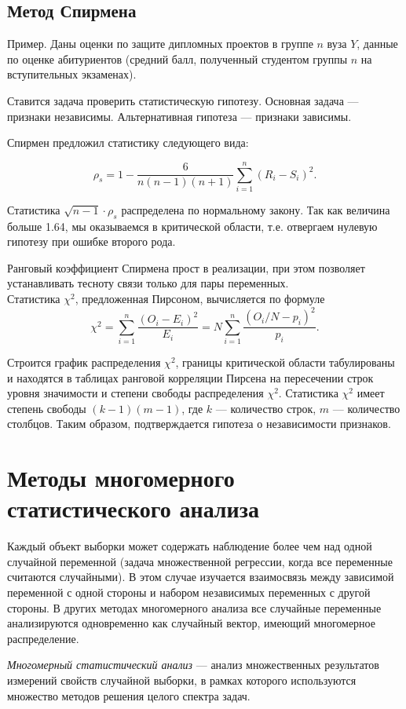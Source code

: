 \documentclass[12pt]{article}
\begin{document}
\subsection{Метод Спирмена}
Пример. Даны оценки по защите дипломных проектов в группе $n$ вуза $Y$, данные по оценке абитуриентов (средний балл, полученный студентом группы $n$ на вступительных экзаменах).

Ставится задача проверить статистическую гипотезу. Основная задача --- признаки независимы. Альтернативная гипотеза --- признаки зависимы.

Спирмен предложил статистику следующего вида:

\[ \rho_s = 1 - \frac{6}{n (n - 1) (n + 1)} \sum_{i=1}^n (R_i - S_i)^2.\]

Статистика $\sqrt{n-1} \cdot \rho_s$ распределена по нормальному закону. Так как величина больше 1.64, мы оказываемся в критической области, т.е. отвергаем нулевую гипотезу при ошибке второго рода.

Ранговый коэффициент Спирмена прост в реализации, при этом позволяет устанавливать тесноту связи только для пары переменных.\\

Статистика $\chi^2$, предложенная Пирсоном, вычисляется по формуле
\[ \chi^2 = \sum_{i=1}^n \frac{(O_i - E_i)^2}{E_i} = N \sum_{i=1}^n \frac{(O_i/N - p_i)^2}{p_i}.\]

Строится график распределения $\chi^2$, границы критической области табулированы и находятся в таблицах ранговой корреляции Пирсена на пересечении строк уровня значимости и степени свободы распределения $\chi^2$. Статистика $\chi^2$ имеет степень свободы $(k-1) (m-1)$, где $k$ --- количество строк, $m$ --- количество столбцов. Таким образом, подтверждается гипотеза о независимости признаков.


\newpage
\section{Методы многомерного статистического анализа}
Каждый объект выборки может содержать наблюдение более чем над одной случайной переменной (задача множественной регрессии, когда все переменные считаются случайными). В этом случае изучается взаимосвязь между зависимой переменной с одной стороны и набором независимых переменных с другой стороны. В других методах многомерного анализа все случайные переменные анализируются одновременно как случайный вектор, имеющий многомерное распределение. 

\emph{Многомерный статистический анализ} --- анализ множественных результатов измерений свойств случайной выборки, в рамках которого используются множество методов решения целого спектра задач. 
\end{document}
